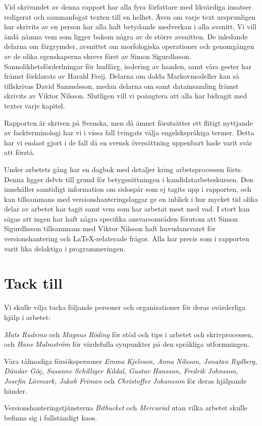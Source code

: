 \documentclass[../rapport_MVEX01-11-05]{subfiles}
\begin{document}
Vid skrivandet av denna rapport har alla fyra författare 
med likvärdiga insatser redigerat och sammanfogat
texten till en helhet. Även om varje text ursprunligen har skrivits av en
person har alla haft betydande medverkan i alla avsnitt.
Vi vill ändå nämna vem som ligger bakom några av de större avsnitten.
De inledande delarna om färgrymder, avsnittet om morfologiska operationer
och genomgången av de olika egenskaperna skrevs först av Simon Sigurdhsson.
Sannolikhetsförderlningar för hudfärg, isolering av handen, samt våra gester
har främst förklarats av Harald Freij.
Delarna om dolda Markovmodeller kan så tillskrivas David Samuelsson, medan
delarna om \knn samt datainsamling främst skrivits av Viktor Nilsson.
Slutligen vill vi poängtera att alla har bidragit med texter varje kapitel.

Rapporten är skriven på Svenska, men då ämnet förutsätter ett flitigt nyttjande
av fackterminologi har vi i vissa fall tvingats välja engelskspråkiga termer.
Detta har vi endast gjort i de fall då en svensk översättning uppenbart hade
varit svår att förstå.

Under arbetets gång har en dagbok med detaljer kring arbetsprocessen
förts. Denna ligger delvis till grund för betygssättningen i
kandidatarbeteskursen. Den innehåller samtidigt information om sidospår som ej
tagits upp i rapporten, och kan tillsammans med versionshanteringsloggar ge
en inblick i hur mycket tid olika delar av arbetet har tagit samt vem som har
arbetat mest med vad. I stort kan sägas att ingen har haft några specifika
ansvarsområden förutom att Simon Sigurdhsson tillsammans med Viktor
Nilsson haft huvudansvaret för versionshantering och \LaTeX-relaterade frågor.
Alla har precis som i rapporten varit lika delaktiga i programmeringen.

\cleardoublepage
\section*{Tack till}
Vi skulle vilja tacka följande personer och organisationer för deras
ovärderliga hjälp i arbetet:

\begin{list}{}{\leftmargin=1em\rightmargin=1em}
\item \emph{Mats Rudemo} och \emph{Magnus Röding} för stöd och tips i arbetet
och skrivprocessen, och
\emph{Hans Malmström} för värdefulla synpunkter på den språkliga utformningen.

\item Våra tålmodiga försökspersoner \emph{Emma Kjelsson, Anna Nilsson,
Jonatan Rydberg, Dündar Göç, Susanne Schilliger Kildal, Gustav Hansson,
Fredrik Johnsson, Josefin Lövmark, Jakob Friman} och \emph{Christoffer
Johansson} för deras hjälpande händer.

\item Versionshanteringstjänsterna \emph{Bitbucket} och \emph{Mercurial} utan vilka
arbetet skulle befinna sig i fullständigt kaos.
\end{list}
\end{document}
